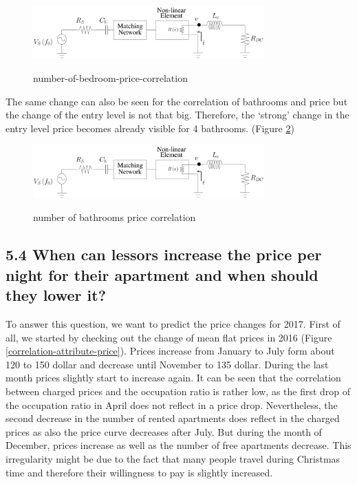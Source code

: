 \begin{figure}
  \begin{center}
  \includegraphics[width=3.5in]{pdf/01.pdf}\\
  \caption{number-of-bedroom-price-correlation}\label{bedroom-price-correlation}
  \end{center}
\end{figure}
The same change can also be seen for the correlation of bathrooms and price but the change of the entry level is not that big. Therefore, the ‘strong’ change in the entry level price becomes already visible for 4 bathrooms. (Figure \ref{bathrooms-price-correlation})
\begin{figure}
  \begin{center}
  \includegraphics[width=3.5in]{pdf/01.pdf}\\
  \caption{number of bathrooms price correlation}\label{bathrooms-price-correlation}
  \end{center}
\end{figure}

\subsection{5.4	When can lessors increase the price per night for their apartment and when should they lower it?}
To answer this question, we want to predict the price changes for 2017. First of all, we started by checking out the change of mean flat prices in 2016 (Figure \ref{correlation-attribute-price}). 
Prices increase from January to July form about 120 to 150 dollar and decrease until November to 135 dollar. During the last month prices slightly start to increase again. It can be seen that the correlation between charged prices and the occupation ratio is rather low, as the first drop of the occupation ratio in April does not reflect in a price drop. Nevertheless, the second decrease in the number of rented apartments does reflect in the charged prices as also the price curve decreases after July. But during the month of December, prices increase as well as the number of free apartments decrease. This irregularity might be due to the fact that many people travel during Christmas time and therefore their willingness to pay is slightly increased. 

